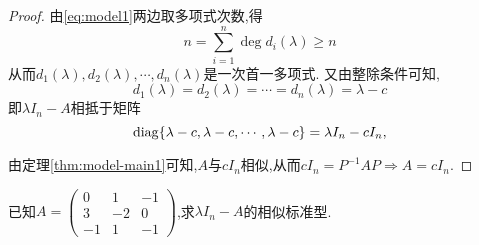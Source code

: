 \begin{proof}
  由\eqref{eq:model1}两边取多项式次数,得
  \begin{equation*}
    n = \sum\limits^n_{i=1}\deg d_i(\lambda) \geq n
  \end{equation*}
  从而$d_1(\lambda),d_2(\lambda),\cdots,d_n(\lambda)$是一次首一多项式.
  又由整除条件可知,
  \begin{equation*}
   d_1(\lambda)=d_2(\lambda)=\cdots=d_n(\lambda)=\lambda-c 
 \end{equation*}
 即$\lambda I_n-A$相抵于矩阵
 \begin{equation*}
  \operatorname{diag}\{\lambda-c,\lambda-c,\cdots,\lambda-c\}=\lambda I_n-cI_n, 
 \end{equation*}

 由定理\ref{thm:model-main1}可知,$A$与$cI_n$相似,从而$cI_n=P^{-1}AP\Longrightarrow A=cI_n$.
\end{proof}
\begin{example}
  已知$A=
  \begin{pmatrix}
    0 & 1 & -1\\
    3 & -2 & 0\\
    -1 & 1 & -1
  \end{pmatrix}
  $,求$\lambda I_n-A$的相似标准型.
\end{example}
